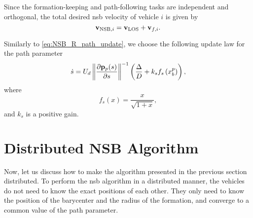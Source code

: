 Since the formation-keeping and path-following tasks are independent and orthogonal, the total desired \gls{nsb} velocity of vehicle $i$ is given by
\begin{equation}
    \mathbf{v}_{{\rm NSB}, i} = \mathbf{v}_{\rm LOS} + \mathbf{v}_{f, i}.
\end{equation}

Similarly to \eqref{eq:NSB_R_path_update}, we choose the following update law for the path parameter
\begin{equation}
    \dot{s} = U_d \left\|\frac{\partial \mathbf{p}_p(s)}{\partial s}\right\|^{-1} \left(\frac{\Delta}{D} + k_s f_s\left(x_b^p\right)\right),
    \label{eq:distr_NSB_path_parameter}
\end{equation}
where
\begin{equation}
    f_s(x) = \frac{x}{\sqrt{1 + x}},
\end{equation}
and $k_s$ is a positive gain.

\section{Distributed NSB Algorithm}
\label{sec:distr_NSB_distributed_NSB}
Now, let us discuss how to make the algorithm presented in the previous section distributed.
To perform the \gls{nsb} algorithm in a distributed manner, the vehicles do not need to know the exact positions of each other.
They only need to know the position of the barycenter and the radius of the formation, and converge to a common value of the path parameter.

